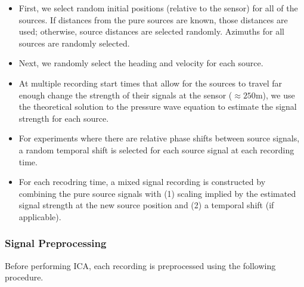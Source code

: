 \documentclass[10pt]{article}
\begin{document}
\begin{itemize}
    \item First, we select random initial positions (relative to the sensor) for all of
        the sources. If distances from the pure sources are known, those distances are
        used; otherwise, source distances are selected randomly. Azimuths for all sources
        are randomly selected.

    \item Next, we randomly select the heading and velocity for each source.

    \item At multiple recording start times that allow for the sources to travel far
        enough change the strength of their signals at the sensor ($\approx 250\textrm{m}$),
        we use the theoretical solution to the pressure wave equation to estimate the
        signal strength for each source.

    \item For experiments where there are relative phase shifts between source signals,
        a random temporal shift is selected for each source signal at each recording time.

    \item For each recodring time, a mixed signal recording is constructed by combining
        the pure source signals with (1) scaling implied by the estimated signal
        strength at the new source position and (2) a temporal shift (if applicable).
\end{itemize}

\subsubsection*{Signal Preprocessing}
Before performing ICA, each recording is preprocessed using the following procedure.
\end{document}
